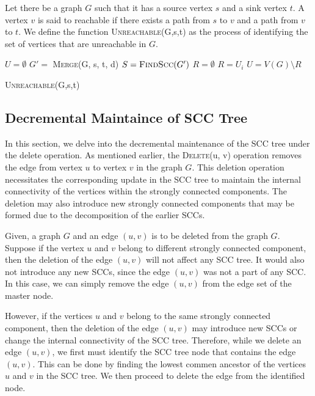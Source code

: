 Let there be a graph $G$ such that it has a source vertex $s$ and a sink vertex $t$.
A vertex $v$ is said to reachable if there exists a path from $s$ to $v$ and a path from $v$ to $t$.
We define the function \textsc{Unreachable}(G,s,t) as the process of identifying the set of vertices that are unreachable in $G$.

\begin{algorithm}[H]
    \SetAlgoLined
    $U = \emptyset$\;
    $G' =$ \textsc{Merge}(G, s, t, d)\;
    $S = \text{\textsc{FindScc}}(G')$\;
    $R = \emptyset$\;
     {
         {
            $R = U_i$
        }
    }
    $U = V(G) \setminus R$\;
    \caption{\textsc{Unreachable}(G,s,t)}
\end{algorithm}




\subsection{Decremental Maintaince of SCC Tree}\label{Subsec: Decremental Maintaince of SCC Tree}

In this section, we delve into the decremental maintenance of the SCC tree under the delete operation.
As mentioned earlier, the \textsc{Delete}(u, v) operation removes the edge from vertex $u$ to vertex $v$ in the graph $G$.
This deletion operation necessitates the corresponding update in the SCC tree to maintain the internal connectivity of the vertices within the strongly connected components.
The deletion may also introduce new strongly connected components that may be formed due to the decomposition of the earlier SCCs.

Given, a graph $G$ and an edge $(u, v)$ is to be deleted from the graph $G$. Suppose if the vertex $u$ and $v$ belong to different strongly connected component, 
then the deletion of the edge $(u, v)$ will not affect any SCC tree. It would also not introduce any new SCCs, since the edge $(u, v)$ was not a part of any SCC.
In this case, we can simply remove the edge $(u, v)$ from the edge set of the master node.

However, if the vertices $u$ and $v$ belong to the same strongly connected component, then the deletion of the edge $(u, v)$ may introduce new SCCs or change the internal connectivity of the SCC tree.
Therefore, while we delete an edge $(u, v)$, we first must identify the SCC tree node that contains the edge $(u, v)$. This can be done by 
finding the lowest commen ancestor of the vertices $u$ and $v$ in the SCC tree. We then proceed to delete the edge from the identified node.

